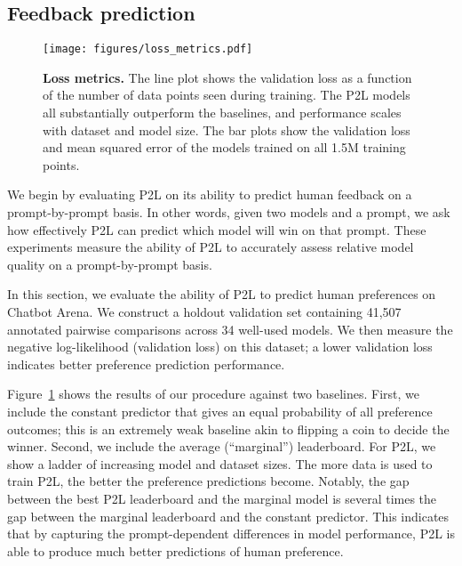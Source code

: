\subsection{Feedback prediction}
\label{sec:validation}

\begin{figure}[t]
    \centering
    \texttt{[image: figures/loss\_metrics.pdf]}
    \caption{\textbf{Loss metrics.} The line plot shows the validation loss as a function of the number of data points seen during training. The P2L models all substantially outperform the baselines, and performance scales with dataset and model size. The bar plots show the validation loss and mean squared error of the models trained on all 1.5M training points.}
    \label{fig:loss-metrics}
    \vspace{-5.0pt}
\end{figure}

We begin by evaluating P2L on its ability to predict human feedback on a prompt-by-prompt basis.
In other words, given two models and a prompt, we ask how effectively P2L can predict which model will win on that prompt.
These experiments measure the ability of P2L to accurately assess relative model quality on a prompt-by-prompt basis.

In this section, we evaluate the ability of P2L to predict human preferences on Chatbot Arena.
We construct a holdout validation set containing 41,507 annotated pairwise comparisons across 34 well-used models.
We then measure the negative log-likelihood (validation loss) on this dataset; a lower validation loss indicates better preference prediction performance.

Figure~\ref{fig:loss-metrics} shows the results of our procedure against two baselines.
First, we include the constant predictor that gives an equal probability of all preference outcomes; this is an extremely weak baseline akin to flipping a coin to decide the winner.
Second, we include the average (``marginal'') leaderboard.
For P2L, we show a ladder of increasing model and dataset sizes.
The more data is used to train P2L, the better the preference predictions become.
Notably, the gap between the best P2L leaderboard and the marginal model is several times the gap between the marginal leaderboard and the constant predictor.
This indicates that by capturing the prompt-dependent differences in model performance, P2L is able to produce much better predictions of human preference.

